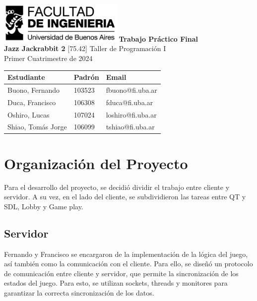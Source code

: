 \documentclass[titlepage,a4paper]{article}
\begin{document}
\begin{titlepage} %
	\hfill\includegraphics[width=6cm]{logofiuba.jpg}
    \centering
    \vfill
    \Huge \textbf{Trabajo Práctico Final\\Jazz Jackrabbit 2}
    \vskip2cm
    \Large [75.42] Taller de Programación I\\
    Primer Cuatrimestre de 2024
    \vfill
    \begin{tabular}{ | l | l | l | } %
      \hline
      \textbf{Estudiante} & \textbf{Padrón} & \textbf{Email} \\ \hline
      Buono, Fernando & 103523 & fbuono@fi.uba.ar \\ \hline
      Duca, Francisco & 106308 & fduca@fi.uba.ar \\ \hline
      Oshiro, Lucas & 107024 & loshiro@fi.uba.ar \\ \hline
      Shiao, Tomás Jorge & 106099 & tshiao@fi.uba.ar \\ \hline
  	\end{tabular}
    \vfill
    \vfill
\end{titlepage}

\clearpage\pagestyle{empty}

\tableofcontents %
\newpage
\setcounter{page}{1}
\pagestyle{fancy}
\setcounter{secnumdepth}{5}
\setcounter{tocdepth}{5}

\section{Organización del Proyecto}
Para el desarrollo del proyecto, se decidió dividir el trabajo entre cliente y servidor. A su vez, en el lado del cliente, se subdividieron las tareas entre QT y SDL, Lobby y Game play. 

\subsection{Servidor}
Fernando y Francisco se encargaron de la implementación de la lógica del juego, así también como la comunicación con el cliente. Para ello, se diseñó un protocolo de comunicación entre cliente y servidor, que permite la sincronización de los estados del juego. Para esto, se utilizan sockets, threads y monitores para garantizar la correcta sincronización de los datos.
\end{document}
